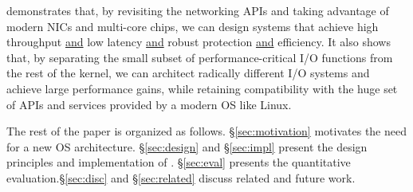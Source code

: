 \ix demonstrates that, by revisiting the networking APIs and taking
advantage of modern NICs and multi-core chips, we can design systems
that achieve high throughput \underline{and} low latency
\underline{and} robust protection \underline{and} efficiency. It also
shows that, by separating the small subset of performance-critical I/O
functions from the rest of the kernel, we can architect radically
different I/O systems and achieve large performance gains, while
retaining compatibility with the huge set of APIs and services
provided by a modern OS like Linux.

The rest of the paper is organized as follows. \S \ref{sec:motivation}
motivates the need for a new OS architecture. \S\ref{sec:design} and
\S\ref{sec:impl} present the design principles and implementation of
\ix. \S\ref{sec:eval} presents the quantitative
evaluation.\S\ref{sec:disc} and \S\ref{sec:related} discuss related
and future work.








